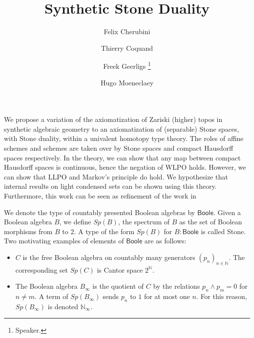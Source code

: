 \documentclass[letterpaper]{../../util/easychair}
\title{Synthetic Stone Duality 
}
\author{
Felix Cherubini %
\and 
 Thierry Coquand%
\and 
 Freek Geerligs%
\thanks{Speaker.}%
\and
 Hugo Moeneclaey %
}
\institute{
  University of Gothenburg and Chalmers University of Technology, Gothenburg, Sweden%
}
\newcommand{\N}{\mathbb{N}}
\newcommand{\Boole}{\mathsf{Boole}}
\newcommand{\Noo}{\N_{\infty}}
\begin{document}
\maketitle
We propose a variation of the axiomatization of Zariski (higher) topos in synthetic algebraic geometry \cite{draft}
to an axiomatization of (separable) Stone spaces, with Stone duality, within a univalent homotopy type theory.  
The roles of affine schemes and schemes are taken over by Stone spaces and compact Hausdorff spaces respectively. 
In the theory, we can show that any map between compact Hausdorff spaces is continuous, hence the negation of WLPO holds. 
However, we can show that LLPO and Markov's principle do hold. 
We hypothesize that internal results on light condensed sets \cite{Dagur,Scholze,Condensed} can be shown using this theory. 
Furthermore, this work can be seen as refinement of the work in \cite{XuE13}

\medskip

We denote the type of countably presented Boolean algebras by $\Boole$.
Given a Boolean algebra $B$, we define $Sp(B)$, the spectrum of $B$ as the set of Boolean morphisms from $B$ to $2$.  
A type of the form $Sp(B)$ for $B:\Boole$ is called Stone.
%
Two motivating examples of elements of $\Boole$ are as follows:
 \begin{itemize}
   \item $C$ is the free Boolean algebra on countably many generators $(p_n)_{n\in\mathbb N}$. 
     The corresponding set $Sp(C)$ is Cantor space $2^\mathbb N$. 
   \item 
     The Boolean algebra $ B_\infty$ is %
     the quotient of $C$ by the relations $p_n\wedge p_m = 0$ for $n\neq m$.  
     A term of $Sp(B_\infty)$ sends $p_n$ to $1$ for at most one $n$. 
     For this reason, $Sp(B_\infty)$ is denoted $\Noo$. 
  \end{itemize} 
\end{document}
